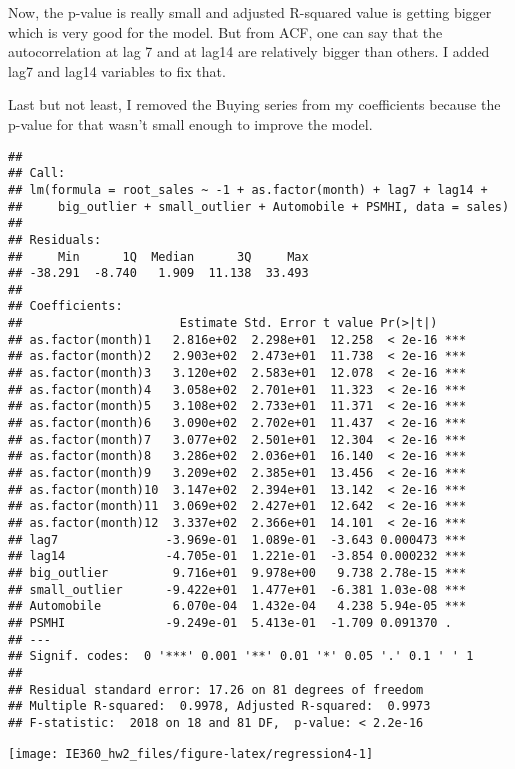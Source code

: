 \documentclass[
]{article}
\begin{document}
Now, the p-value is really small and adjusted R-squared value is getting
bigger which is very good for the model. But from ACF, one can say that
the autocorrelation at lag 7 and at lag14 are relatively bigger than
others. I added lag7 and lag14 variables to fix that.

Last but not least, I removed the Buying series from my coefficients
because the p-value for that wasn't small enough to improve the model.

\begin{verbatim}
## 
## Call:
## lm(formula = root_sales ~ -1 + as.factor(month) + lag7 + lag14 + 
##     big_outlier + small_outlier + Automobile + PSMHI, data = sales)
## 
## Residuals:
##     Min      1Q  Median      3Q     Max 
## -38.291  -8.740   1.909  11.138  33.493 
## 
## Coefficients:
##                      Estimate Std. Error t value Pr(>|t|)    
## as.factor(month)1   2.816e+02  2.298e+01  12.258  < 2e-16 ***
## as.factor(month)2   2.903e+02  2.473e+01  11.738  < 2e-16 ***
## as.factor(month)3   3.120e+02  2.583e+01  12.078  < 2e-16 ***
## as.factor(month)4   3.058e+02  2.701e+01  11.323  < 2e-16 ***
## as.factor(month)5   3.108e+02  2.733e+01  11.371  < 2e-16 ***
## as.factor(month)6   3.090e+02  2.702e+01  11.437  < 2e-16 ***
## as.factor(month)7   3.077e+02  2.501e+01  12.304  < 2e-16 ***
## as.factor(month)8   3.286e+02  2.036e+01  16.140  < 2e-16 ***
## as.factor(month)9   3.209e+02  2.385e+01  13.456  < 2e-16 ***
## as.factor(month)10  3.147e+02  2.394e+01  13.142  < 2e-16 ***
## as.factor(month)11  3.069e+02  2.427e+01  12.642  < 2e-16 ***
## as.factor(month)12  3.337e+02  2.366e+01  14.101  < 2e-16 ***
## lag7               -3.969e-01  1.089e-01  -3.643 0.000473 ***
## lag14              -4.705e-01  1.221e-01  -3.854 0.000232 ***
## big_outlier         9.716e+01  9.978e+00   9.738 2.78e-15 ***
## small_outlier      -9.422e+01  1.477e+01  -6.381 1.03e-08 ***
## Automobile          6.070e-04  1.432e-04   4.238 5.94e-05 ***
## PSMHI              -9.249e-01  5.413e-01  -1.709 0.091370 .  
## ---
## Signif. codes:  0 '***' 0.001 '**' 0.01 '*' 0.05 '.' 0.1 ' ' 1
## 
## Residual standard error: 17.26 on 81 degrees of freedom
## Multiple R-squared:  0.9978, Adjusted R-squared:  0.9973 
## F-statistic:  2018 on 18 and 81 DF,  p-value: < 2.2e-16
\end{verbatim}

\begin{center}\texttt{[image: IE360\_hw2\_files/figure-latex/regression4-1]} \end{center}
\end{document}
